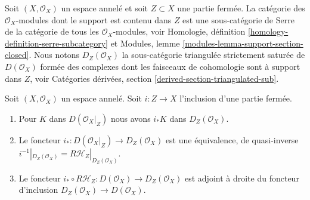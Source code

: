 \noindent
Soit $(X, \mathcal{O}_X)$ un espace annelé et soit $Z \subset X$ une partie fermée. La catégorie des $\mathcal{O}_X$-modules dont le support est contenu dans $Z$ est une sous-catégorie de Serre de la catégorie de tous les $\mathcal{O}_X$-modules, voir Homologie, définition \ref{homology-definition-serre-subcategory} et Modules, lemme \ref{modules-lemma-support-section-closed}. Nous notons $D_Z(\mathcal{O}_X)$ la sous-catégorie triangulée strictement saturée de $D(\mathcal{O}_X)$ formée des complexes dont les faisceaux de cohomologie sont à support dans $Z$, voir Catégories dérivées, section \ref{derived-section-triangulated-sub}.

\begin{lemma}

\label{lemma-complexes-with-support-on-closed}
Soit $(X, \mathcal{O}_X)$ un espace annelé. Soit $i : Z \to X$ l'inclusion d'une partie fermée.
\begin{enumerate}
\item Pour $K$ dans $D(\mathcal{O}_X|_Z)$ nous avons $i_*K$ dans $D_Z(\mathcal{O}_X)$.
\item Le foncteur $i_* : D(\mathcal{O}_X|_Z) \to D_Z(\mathcal{O}_X)$ est une équivalence, de quasi-inverse $i^{-1}|_{D_Z(\mathcal{O}_X)} = R\mathcal{H}_Z|_{D_Z(\mathcal{O}_X)}$.
\item Le foncteur $i_* \circ R\mathcal{H}_Z : D(\mathcal{O}_X) \to D_Z(\mathcal{O}_X)$ est adjoint à droite du foncteur d'inclusion $D_Z(\mathcal{O}_X) \to D(\mathcal{O}_X)$.
\end{enumerate}

\end{lemma}

